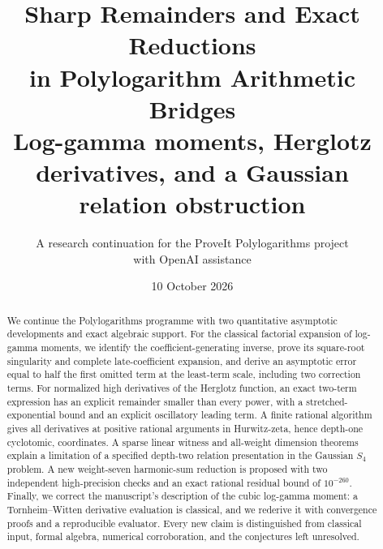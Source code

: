 \documentclass[11pt]{article}
\title{\textcolor{ink}{Sharp Remainders and Exact Reductions\\in Polylogarithm Arithmetic Bridges}\\[7pt]
\large Log-gamma moments, Herglotz derivatives, and a Gaussian relation obstruction}
\author{A research continuation for the ProveIt Polylogarithms project\\
\small with OpenAI assistance}
\date{10 October 2026}
\theoremstyle{definition}
\theoremstyle{remark}
\numberwithin{equation}{section}
\begin{document}
\maketitle
\begin{abstract}
We continue the Polylogarithms programme with two quantitative asymptotic
developments and exact algebraic support. For the classical factorial
expansion of log-gamma moments, we identify the coefficient-generating inverse,
prove its square-root singularity and complete late-coefficient expansion,
and derive an asymptotic error equal to half the first omitted term at the
least-term scale, including two correction terms. For normalized high
derivatives of the Herglotz function, an exact two-term expression has an
explicit remainder smaller than every power, with a stretched-exponential
bound and an explicit oscillatory leading term. A finite rational algorithm gives all derivatives at positive rational
arguments in Hurwitz-zeta, hence depth-one cyclotomic, coordinates. A sparse
linear witness and all-weight dimension theorems explain a limitation of
a specified depth-two relation presentation in the Gaussian \(S_4\) problem.
A new weight-seven harmonic-sum reduction is proposed with two independent
high-precision checks and an exact rational residual bound of \(10^{-260}\).
Finally, we correct the manuscript's description of
the cubic log-gamma moment: a Tornheim--Witten derivative evaluation is
classical, and we rederive it with convergence proofs and a reproducible
evaluator. Every new claim is distinguished from classical input, formal
algebra, numerical corroboration, and the conjectures left unresolved.
\end{abstract}
\tableofcontents
\newpage









\end{document}
